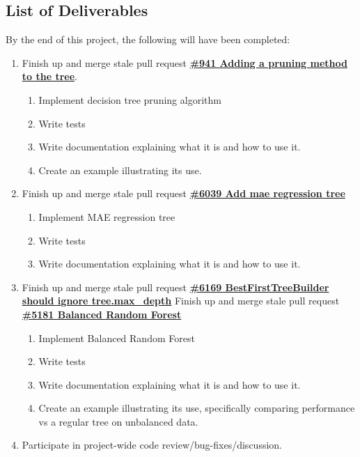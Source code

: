 \documentclass[12pt, oneside]{article}
\begin{document}
\subsection{List of Deliverables}
By the end of this project, the following will have been completed:
\begin{enumerate}
  \item 
  Finish up and merge stale pull request 
  \textbf{\href{https://github.com/scikit-learn/scikit-learn/pull/941}
    {\#941 Adding a pruning method to the tree}}.
  \begin{enumerate}
    \item Implement decision tree pruning algorithm
    \item Write tests
    \item Write documentation explaining what it is and how to use it.
    \item Create an example illustrating its use.
  \end{enumerate}
  \item 
  Finish up and merge stale pull request
  \textbf{\href{https://github.com/scikit-learn/scikit-learn/pull/6039}
    {\#6039 Add mae regression tree}}
  \begin{enumerate}
    \item Implement MAE regression tree
    \item Write tests
    \item Write documentation explaining what it is and how to use it.
  \end{enumerate}
  \item
  Finish up and merge stale pull request
  \textbf{\href{https://github.com/scikit-learn/scikit-learn/pull/6169}
    {\#6169 BestFirstTreeBuilder should ignore tree.max\_depth}}
  Finish up and merge stale pull request
  \textbf{\href{https://github.com/scikit-learn/scikit-learn/pull/5181}
    {\#5181 Balanced Random Forest}}
  \begin{enumerate}
    \item Implement Balanced Random Forest
    \item Write tests
    \item Write documentation explaining what it is and how to use it.
    \item Create an example illustrating its use, specifically
    comparing performance vs a regular tree on unbalanced data.
  \end{enumerate}
  \item Participate in project-wide code review/bug-fixes/discussion.
\end{enumerate}
\end{document}

